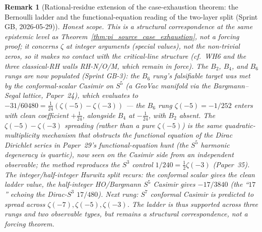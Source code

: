 \documentclass[11pt]{article}
\newtheorem{remark}{Remark}
\begin{document}
\begin{remark}[Rational-residue extension of the case-exhaustion theorem:
the Bernoulli ladder and the functional-equation reading of the two-layer
split (Sprint GB, 2026-05-29)]
\emph{Honest scope.} This is a structural correspondence at the same
epistemic level as Theorem~\ref{thm:pi_source_case_exhaustion}, not a
forcing proof; it concerns $\zeta$ at \emph{integer} arguments
(special values), not the non-trivial zeros, so it makes no contact
with the critical-line structure (cf.\ WH6 and the three classical-RH
walls RH-N/O/M, which remain in force). The $B_2$, $B_4$, \emph{and}
$B_6$ rungs are now populated (Sprint GB-3): the $B_6$ rung's
falsifiable target was met by the conformal-scalar Casimir on $S^5$
(a GeoVac manifold via the Bargmann--Segal lattice, Paper~24), which
evaluates to $-31/60480 = \tfrac{1}{24}(\zeta(-5) - \zeta(-3))$ --- the
$B_6$ rung $\zeta(-5) = -1/252$ enters with clean coefficient
$+\tfrac{1}{24}$, alongside $B_4$ at $-\tfrac{1}{24}$, with $B_2$
\emph{absent}. The $\zeta(-5) - \zeta(-3)$ spreading (rather than a
pure $\zeta(-5)$) is the \emph{same} quadratic-multiplicity mechanism
that obstructs the functional equation of the Dirac Dirichlet series in
Paper~29's functional-equation hunt (the $S^5$ harmonic degeneracy is quartic),
now seen on the Casimir side from an independent observable; the method
reproduces the $S^3$ control $1/240 = \tfrac{1}{2}\zeta(-3)$ (Paper~35).
The integer/half-integer Hurwitz split recurs: the conformal scalar
gives the clean ladder value, the half-integer HO/Bargmann $S^5$
Casimir gives $-17/3840$ (the ``$17$'' echoing the Dirac-$S^3$ $17/480$).
Next rung: $S^7$ conformal Casimir is predicted to spread across
$\zeta(-7), \zeta(-5), \zeta(-3)$. The ladder is thus supported across
three rungs and two observable types, but remains a structural
correspondence, not a forcing theorem.
\end{remark}
\end{document}
